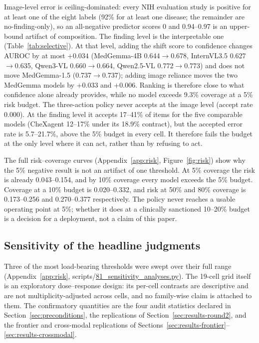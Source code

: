 Image-level error is ceiling-dominated: every NIH evaluation study is positive for at least one of the eight labels (92\% for at least one disease; the remainder are no-finding-only), so an all-negative predictor scores 0 and 0.94--0.97 is an upper-bound artifact of composition. The finding level is the interpretable one (Table~\ref{tab:selective}). At that level, adding the shift score to confidence changes AUROC by at most $+0.034$ (MedGemma-4B 0.644$\rightarrow$0.678, InternVL3.5 0.627$\rightarrow$0.635, Qwen3-VL 0.660$\rightarrow$0.664, Qwen2.5-VL 0.772$\rightarrow$0.773) and does not move MedGemma-1.5 (0.737$\rightarrow$0.737); adding image reliance moves the two MedGemma models by $+0.033$ and $+0.006$. Ranking is therefore close to what confidence alone already provides, while no model exceeds 9.3\% coverage at a 5\% risk budget. The three-action policy never accepts at the image level (accept rate 0.000). At the finding level it accepts 17--41\% of items for the five comparable models (CheXagent 12--17\% under its 18.9\% contract), but the accepted error rate is 5.7--21.7\%, above the 5\% budget in every cell. It therefore fails the budget at the only level where it can act, rather than by refusing to act.

The full risk--coverage curves (Appendix~\ref{app:risk}, Figure~\ref{fig:risk}) show why the 5\% negative result is not an artifact of one threshold. At 5\% coverage the risk is already 0.043--0.154, and by 10\% coverage every model exceeds the 5\% budget. Coverage at a 10\% budget is 0.020--0.332, and risk at 50\% and 80\% coverage is 0.173--0.256 and 0.270--0.377 respectively. The policy never reaches a usable operating point at 5\%; whether it does at a clinically sanctioned 10--20\% budget is a decision for a deployment, not a claim of this paper.






\subsection{Sensitivity of the headline judgments}
\label{sec:sensitivity}

Three of the most load-bearing thresholds were swept over their full range (Appendix~\ref{app:risk}, scripts/\url{81_sensitivity_analyses.py}). The 19-cell grid itself is an exploratory dose--response design: its per-cell contrasts are descriptive and are not multiplicity-adjusted across cells, and no family-wise claim is attached to them. The confirmatory quantities are the four audit statistics declared in Section~\ref{sec:preconditions}, the replications of Section~\ref{sec:results-round2}, and the frontier and cross-modal replications of Sections~\ref{sec:results-frontier}--\ref{sec:results-crossmodal}.

